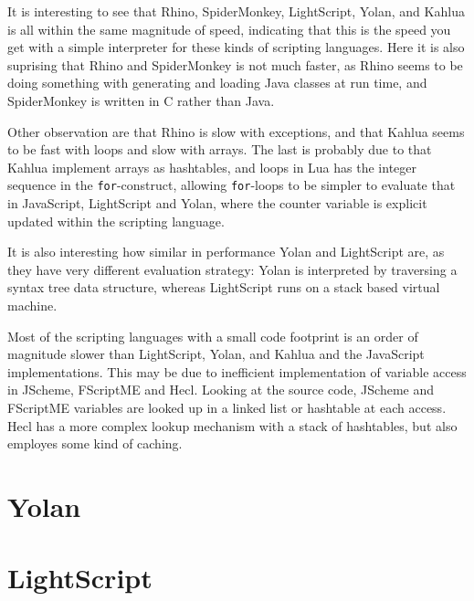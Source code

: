 \documentclass[11pt]{report}
\begin{document}
It is interesting to see that Rhino, SpiderMonkey, LightScript, Yolan, and Kahlua is all within the same magnitude of speed, indicating that this is the speed you get with a simple interpreter for these kinds of scripting languages. Here it is also suprising that Rhino and SpiderMonkey is not much faster, as Rhino seems to be doing something with generating and loading Java classes at run time, and SpiderMonkey is written in C rather than Java.

Other observation are that Rhino is slow with exceptions, and that Kahlua seems to be fast with loops and slow with arrays. The last is probably due to that Kahlua implement arrays as hashtables, and loops in Lua has the integer sequence in the \verb|for|-construct, allowing \verb|for|-loops to be simpler to evaluate that in JavaScript, LightScript and Yolan, where the counter variable is explicit updated within the scripting language.

It is also interesting how similar in performance Yolan and LightScript are, as they have very different evaluation strategy: Yolan is interpreted by traversing a syntax tree data structure, whereas LightScript runs on a stack based virtual machine. 

Most of the scripting languages with a small code footprint is an order of magnitude slower than LightScript, Yolan, and Kahlua and the JavaScript implementations.
This may be due to inefficient implementation of variable access in JScheme, FScriptME and Hecl. Looking at the source code, JScheme and FScriptME variables are looked up in a linked list or hashtable at each access. Hecl has a more complex lookup mechanism with a stack of hashtables, but also employes some kind of caching.

\section{Yolan}

\section{LightScript}
\end{document}
